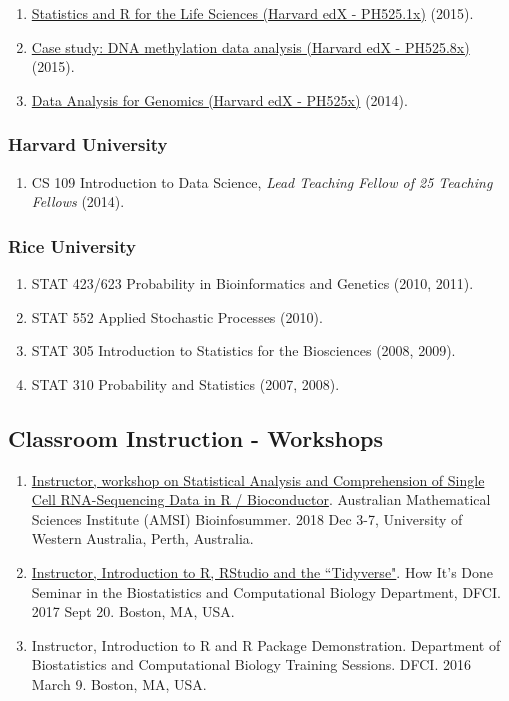 \documentclass[10pt]{article}
\newcommand{\mydot}[1]{\begin{enumerate}[label=$\circ$,leftmargin=\parindent]\setlength{\itemsep}{#1}}
\newcommand{\ee}{\end{enumerate}}
\newcommand{\mylift}[1]{\vspace*{#1}}
\begin{document}
\mydot{-0.1em}

\item \href{https://courses.edx.org/courses/HarvardX/PH525.1x/1T2015/info}{Statistics and R for the Life Sciences (Harvard edX - PH525.1x)} (2015).
\item \href{https://courses.edx.org/courses/HarvardX/PH525.8x/1T2015/info}{Case study: DNA methylation data analysis (Harvard edX - PH525.8x)} (2015).
\item  \href{https://www.edx.org/course/harvardx/harvardx-ph525x-data-analysis-genomics-1401}{Data Analysis for Genomics (Harvard edX - PH525x)} (2014). 

\ee

\subsubsection*{Harvard University}

\mydot{-0.1em}

\item CS 109 Introduction to Data Science, {\it Lead Teaching Fellow of 25 Teaching Fellows} (2014).

\ee

\subsubsection*{Rice University}

\mydot{-0.1em}

\item STAT 423/623 Probability in Bioinformatics and Genetics (2010, 2011).
\item STAT 552 Applied Stochastic Processes (2010).
\item STAT 305 Introduction to Statistics for the Biosciences (2008, 2009).
\item STAT 310 Probability and Statistics (2007, 2008).

\ee


\mylift{-1.5em}
\subsection*{Classroom Instruction - Workshops}

\mydot{-0.1em}

\item \href{https://bis.amsi.org.au}{Instructor, workshop on Statistical Analysis and Comprehension of Single Cell RNA-Sequencing Data in R / Bioconductor}. Australian Mathematical Sciences Institute (AMSI) Bioinfosummer. 2018 Dec 3-7, University of Western Australia, Perth, Australia.
\item \href{https://github.com/stephaniehicks/introRandRStudio}{Instructor, Introduction to R, RStudio and the ``Tidyverse"}. How It's Done Seminar in the Biostatistics and Computational Biology Department, DFCI. 2017 Sept 20. Boston, MA, USA. 
\item Instructor, Introduction to R and R Package Demonstration. Department of Biostatistics and Computational Biology Training Sessions. DFCI. 2016 March 9. Boston, MA, USA.
\ee
\end{document}

